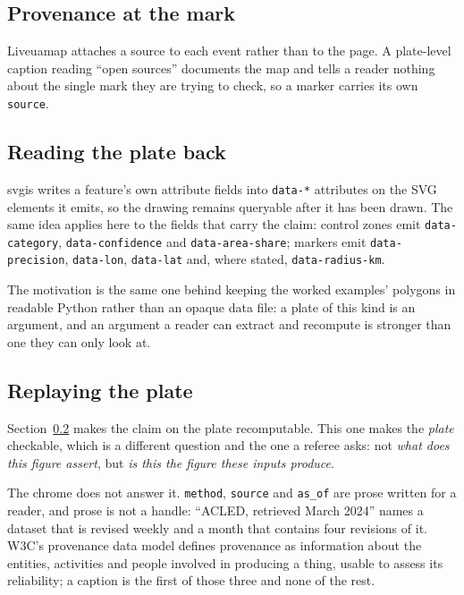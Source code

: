 \documentclass[11pt]{article}
\begin{document}
\subsection{Provenance at the mark}

Liveuamap \cite{liveuamap} attaches a source to each event rather than to
the page. A plate-level caption reading ``open sources'' documents the
map and tells a reader nothing about the single mark they are trying to
check, so a marker carries its own \texttt{source}.

\subsection{Reading the plate back}
\label{sec:plate-readback}

svgis \cite{svgis} writes a feature's own attribute fields into
\texttt{data-*} attributes on the SVG elements it emits, so the drawing
remains queryable after it has been drawn. The same idea applies here to
the fields that carry the claim: control zones emit
\texttt{data-category}, \texttt{data-confidence} and
\texttt{data-area-share}; markers emit \texttt{data-precision},
\texttt{data-lon}, \texttt{data-lat} and, where stated,
\texttt{data-radius-km}.

The motivation is the same one behind keeping the worked examples'
polygons in readable Python rather than an opaque data file: a plate of
this kind is an argument, and an argument a reader can extract and
recompute is stronger than one they can only look at.

\subsection{Replaying the plate}
\label{sec:replay}

Section~\ref{sec:plate-readback} makes the claim on the plate recomputable.
This one makes the \emph{plate} checkable, which is a different question and
the one a referee asks: not \emph{what does this figure assert}, but
\emph{is this the figure these inputs produce}.

The chrome does not answer it. \texttt{method}, \texttt{source} and
\texttt{as\_of} are prose written for a reader, and prose is not a handle:
``ACLED, retrieved March 2024'' names a dataset that is revised weekly and a
month that contains four revisions of it. W3C's provenance data model
\parencite{prov-dm} defines provenance as information about the entities,
activities and people involved in producing a thing, usable to assess its
reliability; a caption is the first of those three and none of the rest.
\end{document}
